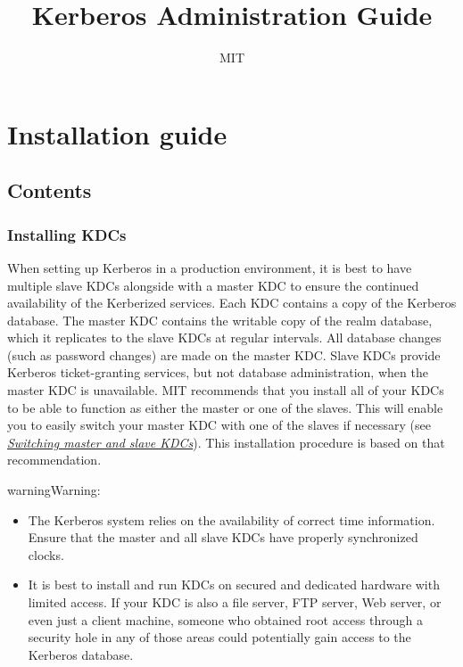 \documentclass[letterpaper,10pt,english]{sphinxmanual}
\title{Kerberos Administration Guide}
\date{ }
\author{MIT}
\begin{document}
\maketitle
\tableofcontents
{}\label{admin/index::doc}



\chapter{Installation guide}
\label{admin/install:for-administrators}\label{admin/install::doc}\label{admin/install:installation-guide}

\section{Contents}
\label{admin/install:contents}

\subsection{Installing KDCs}
\label{admin/install_kdc:installing-kdcs}\label{admin/install_kdc::doc}
When setting up Kerberos in a production environment, it is best to
have multiple slave KDCs alongside with a master KDC to ensure the
continued availability of the Kerberized services.  Each KDC contains
a copy of the Kerberos database.  The master KDC contains the writable
copy of the realm database, which it replicates to the slave KDCs at
regular intervals.  All database changes (such as password changes)
are made on the master KDC.  Slave KDCs provide Kerberos
ticket-granting services, but not database administration, when the
master KDC is unavailable.  MIT recommends that you install all of
your KDCs to be able to function as either the master or one of the
slaves.  This will enable you to easily switch your master KDC with
one of the slaves if necessary (see {\hyperref[admin/install_kdc:switch-master-slave]{\emph{Switching master and slave KDCs}}}).  This
installation procedure is based on that recommendation.

\begin{notice}{warning}{Warning:}\begin{itemize}
\item {} 
The Kerberos system relies on the availability of correct time
information.  Ensure that the master and all slave KDCs have
properly synchronized clocks.

\item {} 
It is best to install and run KDCs on secured and dedicated
hardware with limited access.  If your KDC is also a file
server, FTP server, Web server, or even just a client machine,
someone who obtained root access through a security hole in any
of those areas could potentially gain access to the Kerberos
database.

\end{itemize}
\end{notice}
\end{document}

